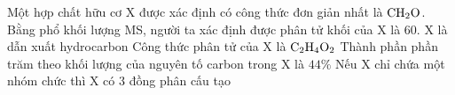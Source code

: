 \documentclass[11pt,a4paper]{article}
\begin{document}
\begin{ex}
Một hợp chất hữu cơ X được xác định có công thức đơn giản nhất là $\ce{CH2O}$. Bằng phổ khối lượng MS, người ta xác định được phân tử khối của X là 60.
\choiceTF
{\True X là dẫn xuất hydrocarbon}
{\True Công thức phân tử của X là $\ce{C2H4O2}$}
{Thành phần phần trăm theo khối lượng của nguyên tố carbon trong X là $44\%$}
{Nếu X chỉ chứa một nhóm chức thì X có 3 đồng phân cấu tạo}

\end{ex}
\end{document}
